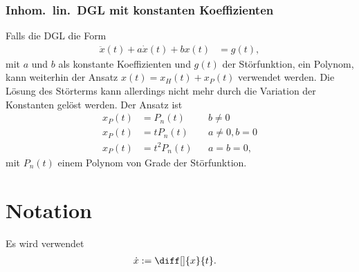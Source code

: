 \documentclass[a4paper,12pt]{article}
\numberwithin{equation}{section}
\begin{document}
\subsubsection{Inhom.\ lin.\ DGL mit konstanten Koeffizienten}
Falls die DGL die Form 
\begin{align} 
        \ddot{x}\left(t\right)+a\dot{x}\left(t\right)+bx\left(t\right)&=g\left(t\right)
,\end{align} 
mit $a$ und $b$ als konstante Koeffizienten und $g\left(t\right)$ der Störfunktion, ein Polynom, kann weiterhin der Ansatz $x\left(t\right)=x_H\left(t\right)+x_P\left(t\right)$ verwendet werden. Die Lösung des Störterms kann allerdings nicht mehr durch die Variation der Konstanten gelöst werden. Der Ansatz ist 
\begin{align} 
        x_P\left(t\right)&=P_n\left(t\right)&&b\neq 0\\
        x_P\left(t\right)&=tP_n\left(t\right)&&a\neq 0,b=0\\
        x_P\left(t\right)&=t^2P_n\left(t\right)&&a=b=0
,\end{align} 
mit $P_n\left(t\right)$ einem Polynom von Grade der Störfunktion.

\newpage
\section{Notation}
Es wird verwendet
\begin{align} 
        \dot{x}&:=\diff[]{x}{t}
.\end{align} 

\end{document}

